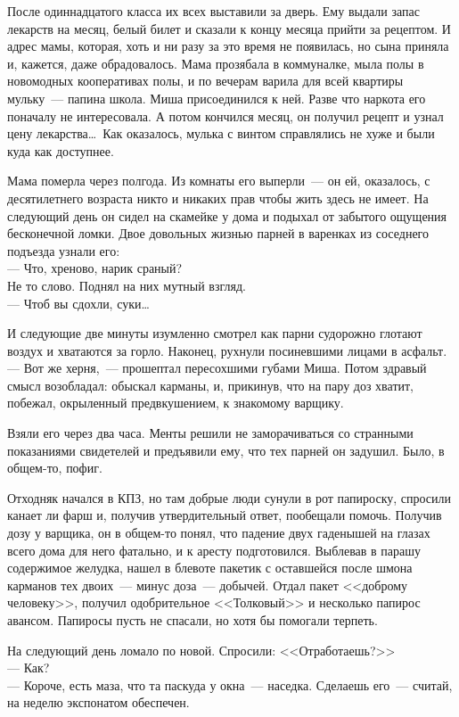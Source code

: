 После одиннадцатого класса их всех выставили за дверь. Ему выдали запас 
лекарств 
на месяц, белый билет и сказали к концу месяца прийти за рецептом. И адрес 
мамы, 
которая, хоть и ни разу за это время не появилась, но сына приняла и, кажется, 
даже обрадовалось. Мама прозябала в коммуналке, мыла полы в новомодных 
кооперативах полы, и по вечерам варила для всей квартиры мульку~--- папина 
школа. 
Миша присоединился к ней. Разве что наркота его поначалу не интересовала. А 
потом кончился месяц, он получил рецепт и узнал цену лекарства\ldots\ Как 
оказалось, 
мулька с винтом справлялись не хуже и были куда как доступнее.



Мама померла через полгода. Из комнаты его выперли~--- он ей, оказалось, с 
десятилетнего возраста никто и никаких прав чтобы жить здесь не имеет. На 
следующий день он сидел на скамейке у дома и подыхал от забытого ощущения 
бесконечной ломки. Двое довольных жизнью парней в варенках из соседнего 
подъезда 
узнали его:\\
---  Что, хреново, нарик сраный?\\
Не то слово. Поднял на них мутный взгляд.\\
---  Чтоб вы сдохли, суки\ldots

И следующие две минуты изумленно смотрел как парни судорожно глотают воздух и 
хватаются за горло. Наконец, рухнули посиневшими лицами в асфальт.\\
--- Вот же херня,~--- прошептал пересохшими губами Миша. Потом здравый смысл 
возобладал: обыскал карманы, и, прикинув, что на пару доз хватит, побежал, 
окрыленный предвкушением, к знакомому варщику.

Взяли его через два часа. Менты решили не заморачиваться со странными 
показаниями свидетелей и предъявили ему, что тех парней он задушил. Было, в 
общем-то, пофиг.

Отходняк начался в КПЗ, но там добрые люди сунули в рот папироску, спросили 
канает ли фарш и, получив утвердительный ответ, пообещали помочь. Получив дозу 
у варщика, он в общем-то понял, что падение двух гаденышей на глазах всего дома 
для него фатально, и к аресту подготовился. Выблевав в парашу содержимое 
желудка, нашел в блевоте пакетик с оставшейся после шмона карманов тех 
двоих~--- минус доза~--- добычей. Отдал пакет <<доброму человеку>>, получил одобрительное 
<<Толковый>> и несколько папирос авансом. Папиросы пусть не спасали, но хотя бы 
помогали терпеть.

На следующий день ломало по новой. Спросили: <<Отработаешь?>>\\
--- Как?\\
--- Короче, есть маза, что та паскуда у окна~--- наседка. Сделаешь его~--- 
считай, на неделю экспонатом обеспечен.

